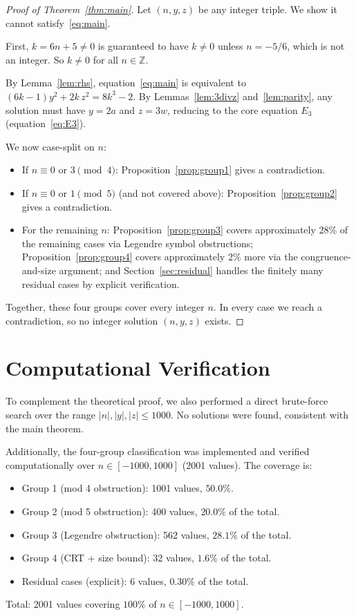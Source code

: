 \documentclass[12pt]{article}
\begin{document}
\begin{proof}[Proof of Theorem~\ref{thm:main}]
Let $(n, y, z)$ be any integer triple. We show it cannot satisfy~\eqref{eq:main}.

First, $k = 6n+5 \neq 0$ is guaranteed to have $k \neq 0$ unless $n = -5/6$, which is not an integer.
So $k \neq 0$ for all $n \in \mathbb{Z}$.

By Lemma~\ref{lem:rhs}, equation~\eqref{eq:main} is equivalent to $(6k-1)y^2 + 2k\,z^2 = 8k^3-2$.
By Lemmas~\ref{lem:3divz} and~\ref{lem:parity}, any solution must have $y = 2a$ and $z = 3w$, 
reducing to the core equation $E_3$ (equation~\eqref{eq:E3}).

We now case-split on $n$:
\begin{itemize}
  \item If $n \equiv 0$ or $3 \pmod 4$: Proposition~\ref{prop:group1} gives a contradiction.
  \item If $n \equiv 0$ or $1 \pmod 5$ (and not covered above): Proposition~\ref{prop:group2} gives a contradiction.
  \item For the remaining $n$: Proposition~\ref{prop:group3} covers approximately 28\% of the remaining cases 
        via Legendre symbol obstructions; Proposition~\ref{prop:group4} covers approximately 2\% more 
        via the congruence-and-size argument; and Section~\ref{sec:residual} handles the finitely many 
        residual cases by explicit verification.
\end{itemize}

Together, these four groups cover every integer $n$. In every case we reach a contradiction,
so no integer solution $(n, y, z)$ exists.
\end{proof}

\section{Computational Verification}

To complement the theoretical proof, we also performed a direct brute-force search 
over the range $|n|, |y|, |z| \leq 1000$. No solutions were found, consistent with the main theorem.

Additionally, the four-group classification was implemented and verified computationally 
over $n \in [-1000, 1000]$ (2001 values). The coverage is:
\begin{itemize}
  \item Group 1 (mod 4 obstruction): 1001 values, $50.0\%$.
  \item Group 2 (mod 5 obstruction): 400 values, $20.0\%$ of the total.
  \item Group 3 (Legendre obstruction): 562 values, $28.1\%$ of the total.
  \item Group 4 (CRT + size bound): 32 values, $1.6\%$ of the total.
  \item Residual cases (explicit): 6 values, $0.30\%$ of the total.
\end{itemize}
Total: 2001 values covering $100\%$ of $n \in [-1000, 1000]$.
\end{document}
